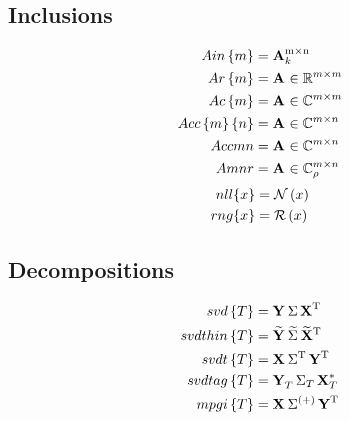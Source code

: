 \subsection{Inclusions}
\begin{equation}
  \begin{split}
    Ain\lst{m} &= \Ain{k}\\
    Ar\lst{m} &= \Ar{m}\\
    Ac\lst{m} &= \Ac{m}\\
    Acc\lst{m}\lst{n} &= \Acc{m}{n}\\
    Accmn &= \Accmn\\
    Amnr  &= \Amnr
  \end{split}
\end{equation}
\begin{equation}
  \begin{split}
    nll \{x\} &= \nll{x}\\
    rng \{x\} &= \rng{x}
  \end{split}
\end{equation}

\subsection{Decompositions}
\begin{equation}
  \begin{split}
    svd\lst{T} &= \svd{T}\\
    svdthin\lst{T} &= \svdthin{T}\\
    svdt\lst{T} &= \svdt{T}\\
    svdtag\lst{T} &= \svdtag{T}\\
    mpgi\lst{T} &= \mpgi{T}\\
  \end{split}
\end{equation}

